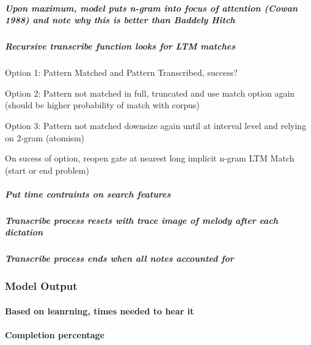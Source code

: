 \documentclass[]{book}
\let\oldparagraph\paragraph
\renewcommand{\paragraph}[1]{\oldparagraph{#1}\mbox{}}
\let\oldsubparagraph\subparagraph
\renewcommand{\subparagraph}[1]{\oldsubparagraph{#1}\mbox{}}
\theoremstyle{definition}
\theoremstyle{definition}
\theoremstyle{definition}
\theoremstyle{remark}
\begin{document}
\hypertarget{upon-maximum-model-puts-n-gram-into-focus-of-attention-cowan-1988-and-note-why-this-is-better-than-baddely-hitch}{%
\subparagraph{Upon maximum, model puts n-gram into focus of attention
(Cowan 1988) and note why this is better than Baddely
Hitch}\label{upon-maximum-model-puts-n-gram-into-focus-of-attention-cowan-1988-and-note-why-this-is-better-than-baddely-hitch}}

\hypertarget{recursive-transcribe-function-looks-for-ltm-matches}{%
\subparagraph{Recursive transcribe function looks for LTM
matches}\label{recursive-transcribe-function-looks-for-ltm-matches}}

Option 1: Pattern Matched and Pattern Transcribed, success?

Option 2: Pattern not matched in full, truncated and use match option
again (should be higher probability of match with corpus)

Option 3: Pattern not matched downsize again until at interval level and
relying on 2-gram (atomism)

On sucess of option, reopen gate at nearest long implicit n-gram LTM
Match (start or end problem)

\hypertarget{put-time-contraints-on-search-features}{%
\subparagraph{Put time contraints on search
features}\label{put-time-contraints-on-search-features}}

\hypertarget{transcribe-process-resets-with-trace-image-of-melody-after-each-dictation}{%
\subparagraph{Transcribe process resets with trace image of melody after
each
dictation}\label{transcribe-process-resets-with-trace-image-of-melody-after-each-dictation}}

\hypertarget{transcribe-process-ends-when-all-notes-accounted-for}{%
\subparagraph{Transcribe process ends when all notes accounted
for}\label{transcribe-process-ends-when-all-notes-accounted-for}}

\hypertarget{model-output}{%
\subsubsection{Model Output}\label{model-output}}

\hypertarget{based-on-leanrning-times-needed-to-hear-it}{%
\paragraph{Based on leanrning, times needed to hear
it}\label{based-on-leanrning-times-needed-to-hear-it}}

\hypertarget{completion-percentage}{%
\paragraph{Completion percentage}\label{completion-percentage}}
\end{document}
